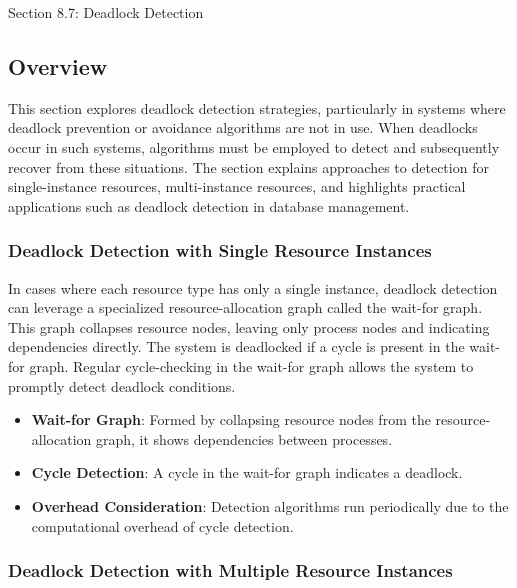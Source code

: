 \begin{notes}{Section 8.7: Deadlock Detection}
    \subsection*{Overview}

    This section explores deadlock detection strategies, particularly in systems where deadlock prevention or avoidance algorithms are not in use. When deadlocks occur in such systems, algorithms must 
    be employed to detect and subsequently recover from these situations. The section explains approaches to detection for single-instance resources, multi-instance resources, and highlights practical 
    applications such as deadlock detection in database management.
    
    \subsubsection*{Deadlock Detection with Single Resource Instances}
    
    In cases where each resource type has only a single instance, deadlock detection can leverage a specialized resource-allocation graph called the wait-for graph. This graph collapses resource nodes, 
    leaving only process nodes and indicating dependencies directly. The system is deadlocked if a cycle is present in the wait-for graph. Regular cycle-checking in the wait-for graph allows the system 
    to promptly detect deadlock conditions.
    
    \begin{highlight}
    
        \begin{itemize}
            \item \textbf{Wait-for Graph}: Formed by collapsing resource nodes from the resource-allocation graph, it shows dependencies between processes.
            \item \textbf{Cycle Detection}: A cycle in the wait-for graph indicates a deadlock.
            \item \textbf{Overhead Consideration}: Detection algorithms run periodically due to the computational overhead of cycle detection.
        \end{itemize}
    
    \end{highlight}
    
    \subsubsection*{Deadlock Detection with Multiple Resource Instances}
    

\end{notes}
